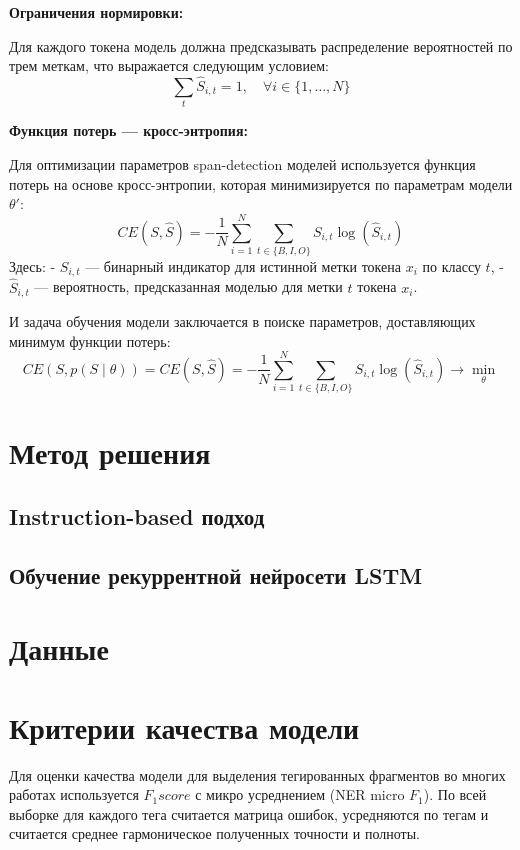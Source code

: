 \documentclass[12pt]{article}
\begin{document}
\textbf{Ограничения нормировки:}

   Для каждого токена модель должна предсказывать распределение вероятностей по трем меткам, что выражается следующим условием:
   $$
   \sum_t \hat{S}_{i, t} = 1, \quad \forall i \in \{1, \dots, N\}
   $$

\textbf{Функция потерь — кросс-энтропия:}

   Для оптимизации параметров span-detection моделей используется функция потерь на основе кросс-энтропии, которая минимизируется по параметрам модели \( \theta' \):
   $$
   CE(S, \hat{S}) = -\frac{1}{N} \sum_{i=1}^{N} \sum_{t \in \{B, I, O\}} S_{i, t} \log(\hat{S}_{i, t})
   $$
   Здесь:
   - \( S_{i, t} \) — бинарный индикатор для истинной метки токена \( x_i \) по классу \( t \),
   - \( \hat{S}_{i, t} \) — вероятность, предсказанная моделью для метки \( t \) токена \( x_i \).

И задача обучения модели заключается в поиске параметров, доставляющих минимум функции потерь:
$$
CE(S, p(S \mid \theta)) = CE(S, \hat{S}) = -\frac{1}{N} \sum_{i=1}^{N} \sum_{t \in \{B, I, O\}} S_{i, t} \log(\hat{S}_{i, t}) \longrightarrow \min_{\theta}
$$

\clearpage
\section{Метод решения}
\subsection{Instruction-based подход}
\subsection{Обучение рекуррентной нейросети LSTM}

\clearpage
\section{Данные}


\clearpage
\section{Критерии качества модели}

Для оценки качества модели для выделения тегированных фрагментов во многих работах используется $F_1 score$ с микро усреднением (NER micro $F_1$). По всей выборке для каждого тега считается матрица ошибок, усредняются по тегам и считается среднее гармоническое полученных точности и полноты.
\end{document}

